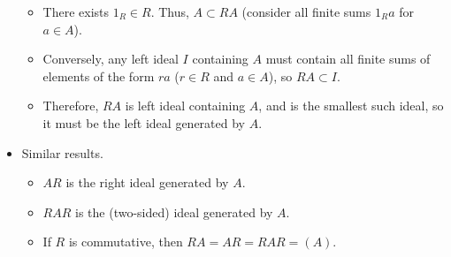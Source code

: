 \documentclass[../notes.tex]{subfiles}
\begin{document}
\begin{itemize}
\begin{itemize}
        \item There exists $1_R\in R$. Thus, $A\subset RA$ (consider all finite sums $1_Ra$ for $a\in A$).
        \item Conversely, any left ideal $I$ containing $A$ must contain all finite sums of elements of the form $ra$ ($r\in R$ and $a\in A$), so $RA\subset I$.
        \item Therefore, $RA$ is left ideal containing $A$, and is the smallest such ideal, so it must be the left ideal generated by $A$.
    \end{itemize}
    \item Similar results.
    \begin{itemize}
        \item $AR$ is the right ideal generated by $A$.
        \item $RAR$ is the (two-sided) ideal generated by $A$.
        \item If $R$ is commutative, then $RA=AR=RAR=(A)$.
    \end{itemize}
\end{itemize}
\end{document}
